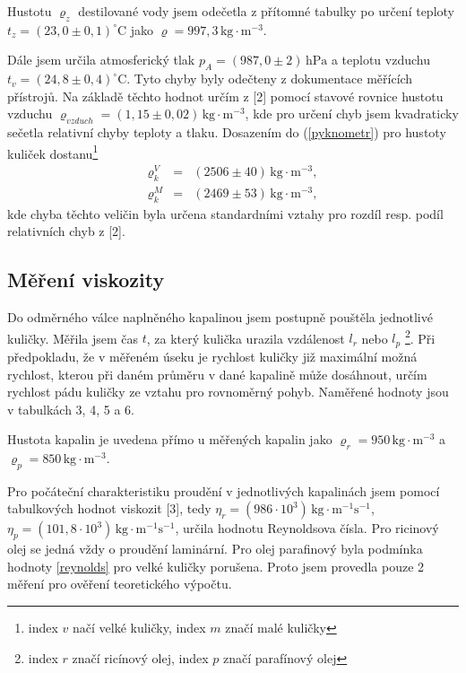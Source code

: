 \documentclass[a4paper,12pt]{article}
\begin{document}
Hustotu $\varrho_z$ destilované vody jsem odečetla z přítomné tabulky po 
určení teploty $t_z =(23,0 \pm 0,1)^{\circ}\mathrm{C}$ jako $\varrho = 997,3 \, \mathrm{kg \cdot m^{-3}}$.

Dále jsem určila atmosferický tlak $p_A = (987,0 \pm 2) \, \mathrm{hPa}$ a 
teplotu vzduchu $t_v =(24,8 \pm 0,4)^{\circ}\mathrm{C}$. Tyto chyby byly 
odečteny z dokumentace měřících přístrojů. Na základě těchto hodnot určím 
z [2] pomocí stavové rovnice hustotu vzduchu $\varrho_{vzduch} = (1,15 \pm 0,02) \, \mathrm{kg \cdot m^{-3}}$, 
kde pro určení chyb jsem kvadraticky sečetla relativní chyby teploty a tlaku.
Dosazením do (\ref{pyknometr}) pro hustoty kuliček dostanu\footnote{index $v$ načí velké kuličky, index $m$ značí malé kuličky}
\begin{eqnarray}
\nonumber \varrho_{k}^{V} &=& (2506 \pm 40) \, \mathrm{kg \cdot m^{-3}}, \\
\nonumber \varrho_{k}^{M} &=& (2469 \pm 53) \, \mathrm{kg \cdot m^{-3}},
\end{eqnarray}
kde chyba těchto veličin byla určena standardními vztahy pro rozdíl resp. podíl
relativních chyb z [2].

\subsection{Měření viskozity}

Do odměrného válce naplněného kapalinou jsem postupně pouštěla jednotlivé 
kuličky. Měřila jsem čas $t$, za který kulička urazila vzdálenost $l_r$ nebo 
$l_p$ \footnote{index $r$ značí ricínový olej, index $p$ značí parafínový olej}.
Při předpokladu, že v měřeném úseku je rychlost kuličky již maximální možná rychlost,
kterou při daném průměru v dané kapalině může dosáhnout, určím rychlost pádu kuličky 
ze vztahu pro rovnoměrný pohyb. Naměřené hodnoty jsou v tabulkách 3, 4, 
5 a 6.

Hustota kapalin je uvedena přímo u měřených kapalin jako $\varrho_r = 950 \, \mathrm{kg \cdot m^{-3}}$ a
$\varrho_p = 850 \, \mathrm{kg \cdot m^{-3}}$. 

Pro počáteční charakteristiku proudění v jednotlivých kapalinách jsem pomocí 
tabulkových hodnot viskozit [3], tedy $\eta_r = (986 \cdot 10^3) \, \mathrm{kg \cdot m^{-1} s^{-1}}$, 
$\eta_p = (101,8 \cdot 10^3) \, \mathrm{kg \cdot m^{-1} s^{-1}}$, určila hodnotu Reynoldsova 
čísla. Pro ricinový olej se jedná vždy o proudění laminární. Pro olej parafinový 
byla podmínka hodnoty \ref{reynolds} pro velké kuličky porušena. Proto jsem provedla 
pouze 2 měření pro ověření teoretického výpočtu.
\end{document}
